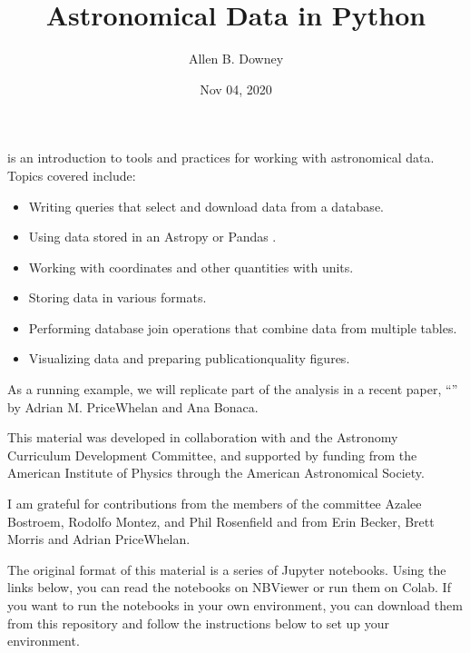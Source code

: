 \documentclass[letterpaper,10pt,english]{sphinxmanual}
\title{Astronomical Data in Python}
\date{Nov 04, 2020}
\author{Allen B.\@{} Downey}
\begin{document}
\pagestyle{empty}
\sphinxmaketitle
\pagestyle{plain}
\sphinxtableofcontents
\pagestyle{normal}
\label{\detokenize{README::doc}}


 is an introduction to tools and practices for working with astronomical data.  Topics covered include:
\begin{itemize}
\item {} 
Writing queries that select and download data from a database.

\item {} 
Using data stored in an Astropy  or Pandas .

\item {} 
Working with coordinates and other quantities with units.

\item {} 
Storing data in various formats.

\item {} 
Performing database join operations that combine data from multiple tables.

\item {} 
Visualizing data and preparing publication\sphinxhyphen{}quality figures.

\end{itemize}

As a running example, we will replicate part of the analysis in a recent paper, “” by Adrian M. Price\sphinxhyphen{}Whelan and Ana Bonaca.

This material was developed in collaboration with  and the Astronomy Curriculum Development Committee, and supported by funding from the American Institute of Physics through the American Astronomical Society.

I am grateful for contributions from the members of the committee \textendash{} Azalee Bostroem, Rodolfo Montez, and Phil Rosenfield \textendash{} and from Erin Becker, Brett Morris and Adrian Price\sphinxhyphen{}Whelan.

The original format of this material is a series of Jupyter notebooks.  Using the
links below, you can read the notebooks on NBViewer or run them on Colab.  If you
want to run the notebooks in your own environment, you can download them from
this repository and follow the instructions below to set up your environment.
\end{document}
